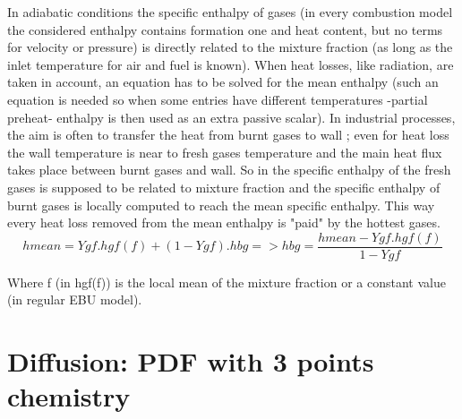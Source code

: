 In adiabatic conditions the specific enthalpy of gases ({\small in
every combustion model the considered enthalpy contains formation one
and heat content, but no terms for velocity or pressure}) is directly
related to the mixture fraction ({\small as long as the inlet
temperature for air and fuel is known}). When heat losses, like
radiation, are taken in account, an equation has to be solved for the
mean enthalpy ({\small such an equation is needed so when some entries
have different temperatures -partial preheat- enthalpy is then used as
an extra passive scalar}). In industrial processes, the aim is often
to transfer the heat from burnt gases to wall ; even for heat loss the
wall temperature is near to fresh gases temperature and the main heat
flux takes place between burnt gases and wall. So in \CS the specific
enthalpy of the fresh gases is supposed to be related to mixture
fraction and the specific enthalpy of burnt gases is locally computed
to reach the mean specific enthalpy. This way every heat loss removed
from the mean enthalpy is "paid" by the hottest gases.\\

\begin{equation}
hmean = Ygf.hgf(f) + (1-Ygf).hbg => hbg
= \frac{hmean-Ygf.hgf(f)}{1-Ygf}
\end{equation}

Where f ({\small in hgf(f)}) is the local mean of the mixture fraction
or a constant value ({\small in regular EBU model}).

\section{Diffusion: PDF with 3 points chemistry}

